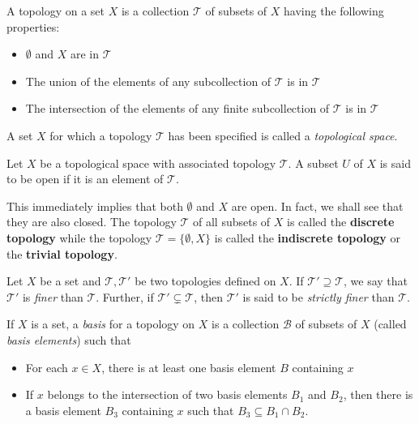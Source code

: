 \newcommand{\T}{\mathcal{T}}
\newcommand{\B}{\mathcal{B}}
\renewcommand{\S}{\mathcal{S}}
\newcommand{\Int}{\operatorname{Int}}
\newcommand{\e}{\epsilon}
\newcommand{\diam}{\operatorname{diam}}
\begin{definition}
    A topology on a set $X$ is a collection $\T$ of subsets of $X$ having the following properties:
    \begin{itemize}
        \item $\emptyset$ and $X$ are in $\T$ 
        \item The union of the elements of any subcollection of $\T$ is in $\T$ 
        \item The intersection of the elements of any finite subcollection of $\T$ is in $\T$
    \end{itemize}
    A set $X$ for which a topology $\T$ has been specified is called a \textit{topological space}.
\end{definition}

\begin{definition}
    Let $X$ be a topological space with associated topology $\T$. A subset $U$ of $X$ is said to be open if it is an element of $\T$.
\end{definition}
This immediately implies that both $\emptyset$ and $X$ are open. In fact, we shall see that they are also closed. The topology $\T$ of all subsets of $X$ is called the \textbf{discrete topology} while the topology $\T = \{\emptyset, X\}$ is called the \textbf{indiscrete topology} or the \textbf{trivial topology}.

\begin{definition}
    Let $X$ be a set and $\T, \T'$ be two topologies defined on $X$. If $\T'\supseteq\T$, we say that $\T'$ is \textit{finer} than $\T$. Further, if $\T'\subsetneq\T$, then $\T'$ is said to be \textit{strictly finer} than $\T$.
\end{definition}

\begin{definition}[Basis]
    If $X$ is a set, a \textit{basis} for a topology on $X$ is a collection $\B$ of subsets of $X$ (called \textit{basis elements}) such that 
    \begin{itemize}
        \item For each $x\in X$, there is at least one basis element $B$ containing $x$
        \item If $x$ belongs to the intersection of two basis elements $B_1$ and $B_2$, then there is a basis element $B_3$ containing $x$ such that $B_3\subseteq B_1\cap B_2$.
    \end{itemize}
\end{definition}

